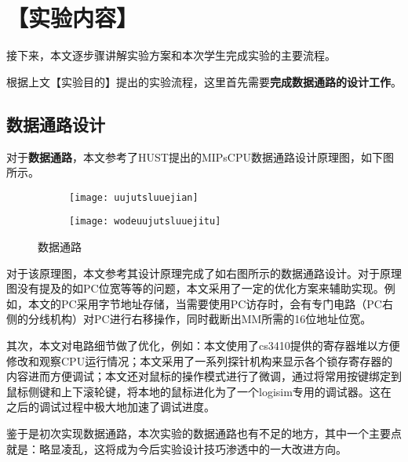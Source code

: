 \documentclass[withoutpreface]{cumcmthesis} %
\begin{document}
\section{【实验内容】}
接下来，本文逐步骤讲解实验方案和本次学生完成实验的主要流程。

根据上文【实验目的】提出的实验流程，这里首先需要\textbf{完成数据通路的设计工作}。
\subsection{数据通路设计}
对于\textbf{数据通路}，本文参考了HUST提出的MIPsCPU数据通路设计原理图，如下图所示。
\begin{figure}[!htbp]
    \begin{subfigure}[c]{0.4\textwidth}
    \texttt{[image: uujutsluuejian]}
    \end{subfigure}
    \begin{subfigure}[c]{0.4\textwidth}
    \texttt{[image: wodeuujutsluuejitu]}
    \end{subfigure}
    \caption{数据通路}
\end{figure}
对于该原理图，本文参考其设计原理完成了如右图所示的数据通路设计。对于原理图没有提及的如PC位宽等等的问题，本文采用了一定的优化方案来辅助实现。例如，本文的PC采用字节地址存储，当需要使用PC访存时，会有专门电路（PC右侧的分线机构）对PC进行右移操作，同时截断出MM所需的16位地址位宽。

其次，本文对电路细节做了优化，例如：本文使用了cs3410提供的寄存器堆以方便修改和观察CPU运行情况；本文采用了一系列探针机构来显示各个锁存寄存器的内容进而方便调试；本文还对鼠标的操作模式进行了微调，通过将常用按键绑定到鼠标侧键和上下滚轮键，将本地的鼠标进化为了一个logisim专用的调试器。这在之后的调试过程中极大地加速了调试进度。

鉴于是初次实现数据通路，本次实验的数据通路也有不足的地方，其中一个主要点就是：略显凌乱，这将成为今后实验设计技巧渗透中的一大改进方向。
\end{document}
